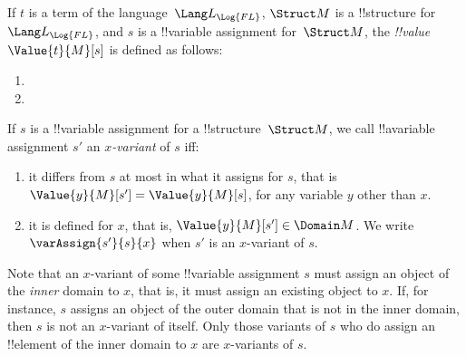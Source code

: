 \documentclass[../../../include/open-logic-section]{subfiles}
\begin{document}
\begin{defn}
If $t$ is a term of the language~$\Lang L_{\Log{FL}}$, $\Struct M$ is a
!!{structure} for~$\Lang L_{\Log{FL}}$, and $s$ is a !!{variable} assignment
for~$\Struct M$, the \emph{!!{value}}~$\Value{t}{M}[s]$ is defined as
follows:
\begin{enumerate}
\item {}
\item {}
\end{enumerate}
\end{defn}

\begin{defn}[$x$-Variant]
If $s$ is a !!{variable} assignment for a !!{structure}~$\Struct M$, we
call !!a{variable} assignment $s'$ an \emph{$x$-variant} of $s$ iff:
\begin{enumerate}
\item it differs from $s$ at most in what it assigns for $s$, that is 
 $\Value{y}{M}[s'] = \Value{y}{M}[s]$, for any variable $y$ other 
 than $x$.
\item it is defined for $x$, that is, $\Value{y}{M}[s'] \in \Domain M$.
We write $\varAssign{s'}{s}{x}$ when $s'$ is an $x$-variant of $s$.
\end{enumerate}
\end{defn}

Note that an $x$-variant of some !!{variable} assignment $s$ must assign
an object of the \emph{inner} domain to $x$, that is, it must assign 
an existing object to $x$. If, for instance, $s$ assigns an object of
the outer domain that is not in the inner domain, then $s$ is not an $x$-variant
of itself. Only those variants of $s$ who do assign an !!{element} of
the inner domain to $x$ are $x$-variants of $s$. 
\end{document}
